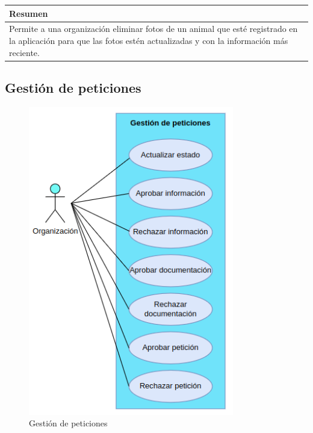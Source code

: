 \begin{table}[H]
    \centering
    \begin{tabularx}{\textwidth}{@{} |L |@{}} \hline
        \textbf{Resumen} \\
        \hline
        Permite a una organización eliminar fotos de un animal que esté registrado en la aplicación para que las
    fotos estén actualizadas y con la información más reciente. \\
        \hline
    \end{tabularx}
\end{table}

\subsection{Gestión de peticiones}\label{subsec:gestion-de-peticiones}

\begin{figure}[H]
    \centering
    \includegraphics[width=0.8\textwidth]{imgs/gestion-peticiones}
    \caption{Gestión de peticiones}
    \label{fig:diagrama-caso-uso-gestion-peticiones}
\end{figure}

